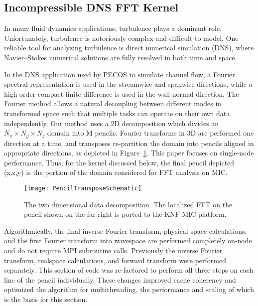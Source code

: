 \subsection{Incompressible DNS FFT Kernel}
\label{sec:dns}

In many fluid dynamics applications, turbulence plays a
dominant role. Unfortunately, turbulence is notoriously complex and
difficult to model.  One reliable tool for analyzing turbulence is
direct numerical simulation (DNS)\cite{jimenez:2007}, where
Navier--Stokes numerical solutions are fully resolved in both time and space. 

In the DNS application used
by PECOS to simulate channel flow, a Fourier spectral
representation is used in the streamwise and spanwise directions,
while a high order compact finite difference is used in the
wall-normal direction\cite{KMM:87,Lele:92}.
The Fourier method allows a natural decoupling between different modes
in transformed space such that multiple tasks can operate on their own data
independently. Our method uses a 2D decomposition which divides an $N_x
\times N_y \times N_z$ domain into M pencils. Fourier transforms in 3D
are performed one direction at a time, and transposes 
re-partition the domain into pencils aligned in appropriate
directions,
as depicted in Figure~\ref{fig:pencil2}. This
paper focuses on single-node performance.  Thus,
for the kernel discussed below, the final pencil depicted (x,z,y) is
the portion of the domain considered for FFT analysis on MIC.

\begin{figure}[htb]
 \begin{center}
  \texttt{[image: PencilTransposeSchematic]}
  \caption{The two dimensional data decomposition. The localized FFT
    on the pencil shown on the far right is ported to the KNF MIC platform.}
    \label{fig:pencil2}
 \end{center}
\end{figure}

Algorithmically, the final inverse Fourier transform, physical space
calculations, and the first Fourier transform into wavespace are
performed completely on-node and do not require MPI subroutine calls. 
Previously the inverse Fourier transform, realspace calculations,
and forward transform were performed separately. This section of code
was re-factored to perform all three steps on each line of the pencil
individually. These changes improved cache coherency and optimized the
algorithm for multithreading, the performance and scaling of which is
the basis for this section. 

